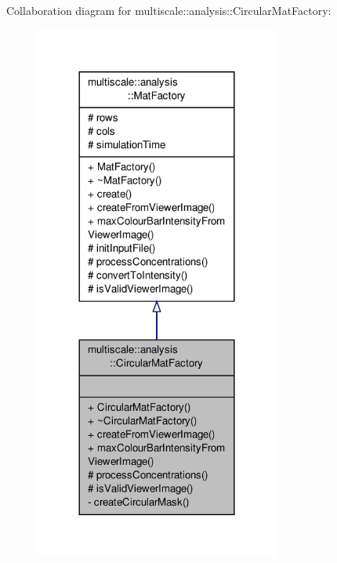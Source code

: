 Collaboration diagram for multiscale\-:\-:analysis\-:\-:Circular\-Mat\-Factory\-:\nopagebreak
\begin{figure}[H]
\begin{center}
\leavevmode
\includegraphics[width=228pt]{classmultiscale_1_1analysis_1_1CircularMatFactory__coll__graph}
\end{center}
\end{figure}

